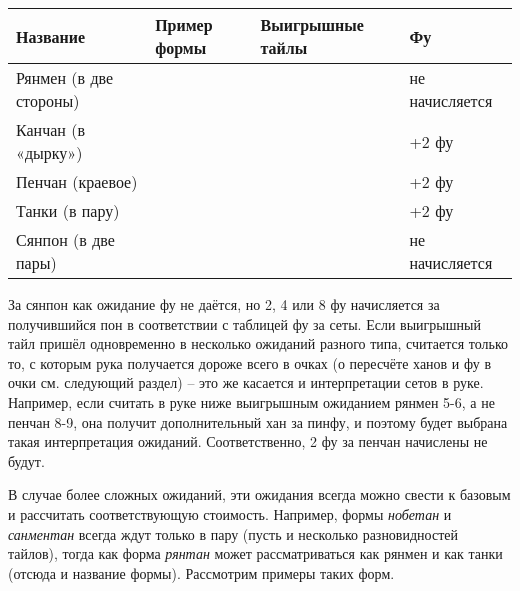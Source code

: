 \noindent\begin{tabular}{|C{3cm}|C{5cm}|C{3cm}|C{3cm}|}
\hline
	Название  &
	Пример формы &
	Выигрышные тайлы &
	Фу \\
\hline
	\rule[0ex]{0pt}{5ex} Рянмен \newline (в две стороны) \newline &
	 &
	 &
	не начисляется \\
\hline
	\rule[0ex]{0pt}{5ex} Канчан \newline (в «дырку») \newline &
	 &
	 &
	+2 фу \\
\hline
	\rule[0ex]{0pt}{5ex} Пенчан \newline (краевое) \newline &
	 &
	 &
	+2 фу \\
\hline
	\rule[0ex]{0pt}{5ex} Танки \newline (в пару) \newline &
	 &
	 &
	+2 фу \\
\hline
	\rule[0ex]{0pt}{5ex} Сянпон \newline (в две пары) \newline &
	 &
	 &
	не начисляется \\
\hline
\end{tabular}

За сянпон как ожидание фу не даётся, но 2, 4 или 8 фу начисляется за получившийся пон в соответствии с таблицей фу за сеты. Если выигрышный тайл пришёл одновременно в несколько ожиданий разного типа, считается только то, с которым рука получается дороже всего в очках (о пересчёте ханов и фу в очки см. следующий раздел) – это же касается и интерпретации сетов в руке. Например, если считать в руке ниже выигрышным ожиданием рянмен 5-6, а не пенчан 8-9, она получит дополнительный хан за  пинфу,  и поэтому будет выбрана такая интерпретация ожиданий. Соответственно, 2 фу за пенчан начислены не будут.


В случае более сложных ожиданий, эти ожидания всегда можно свести к базовым и рассчитать соответствующую стоимость. Например, формы \textit{нобетан} и \textit{санментан} всегда ждут только в пару (пусть и несколько разновидностей тайлов), тогда как форма \textit{рянтан} может рассматриваться как рянмен и как танки (отсюда и название формы). Рассмотрим примеры таких форм.

